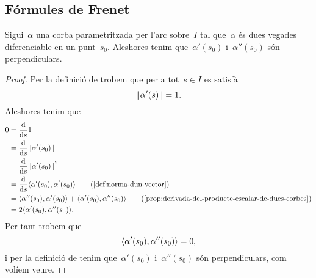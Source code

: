 \documentclass[../../main.tex]{subfiles}
\begin{document}
    \subsection{Fórmules de Frenet}
    \begin{proposition}
        \label{prop:la-primera-derivada-i-la-segona-derivada-duna-corba-son-perpendiculars}
        Sigui~\(\alpha\) una corba parametritzada per l'arc sobre~\(I\) tal que~\(\alpha\) és dues vegades diferenciable en un punt~\(s_{0}\).
        Aleshores tenim que~\(\alpha'(s_{0})\) i~\(\alpha''(s_{0})\) són perpendiculars.
    \begin{proof}
        Per la definició de  trobem que per a tot~\(s\in I\) es satisfà
        \[
            \norm{\alpha'(s)}=1.
        \]
        Aleshores tenim que
        \begin{align*}
            0&=\frac{\diff}{\diff s}1 \\
            &=\frac{\diff}{\diff s}\norm{\alpha'(s_{0})} \\
            &=\frac{\diff}{\diff s}\norm{\alpha'(s_{0})}^{2} \\
            &=\frac{\diff}{\diff s}\prodesc{\alpha'(s_{0})}{\alpha'(s_{0})} \tag{\ref{def:norma-dun-vector}} \\
            &=\prodesc{\alpha''(s_{0})}{\alpha'(s_{0})}+\prodesc{\alpha'(s_{0})}{\alpha''(s_{0})} \tag{\ref{prop:derivada-del-producte-escalar-de-dues-corbes}} \\
            &=2\prodesc{\alpha'(s_{0})}{\alpha''(s_{0})}.
        \end{align*}
        Per tant trobem que
        \[
            \prodesc{\alpha'(s_{0})}{\alpha''(s_{0})}=0,
        \]
        i per la definició de  tenim que~\(\alpha'(s_{0})\) i~\(\alpha''(s_{0})\) són perpendiculars, com volíem veure.
    \end{proof}
    \end{proposition}
\end{document}
